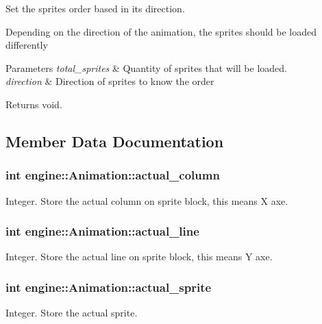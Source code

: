 Set the sprites order based in its direction. 

Depending on the direction of the animation, the sprites should be loaded differently


\begin{DoxyParams}{Parameters}
{\em total\+\_\+sprites} & Quantity of sprites that will be loaded. \\
\hline
{\em direction} & Direction of sprites to know the order \\
\hline
\end{DoxyParams}
\begin{DoxyReturn}{Returns}
void. 
\end{DoxyReturn}


\subsection{Member Data Documentation}
\subsubsection[{\texorpdfstring{actual\+\_\+column}{actual_column}}]{\setlength{\rightskip}{0pt plus 5cm}int engine\+::\+Animation\+::actual\+\_\+column}\hypertarget{classengine_1_1_animation_afe6d357389bc518781784af14d561445}{}\label{classengine_1_1_animation_afe6d357389bc518781784af14d561445}
Integer. Store the actual column on sprite block, this means X axe. 
\subsubsection[{\texorpdfstring{actual\+\_\+line}{actual_line}}]{\setlength{\rightskip}{0pt plus 5cm}int engine\+::\+Animation\+::actual\+\_\+line}\hypertarget{classengine_1_1_animation_ac0d6da823ddcc6e359df78bd3a88dbfc}{}\label{classengine_1_1_animation_ac0d6da823ddcc6e359df78bd3a88dbfc}
Integer. Store the actual line on sprite block, this means Y axe. 
\subsubsection[{\texorpdfstring{actual\+\_\+sprite}{actual_sprite}}]{\setlength{\rightskip}{0pt plus 5cm}int engine\+::\+Animation\+::actual\+\_\+sprite}\hypertarget{classengine_1_1_animation_a85d2b1875a28c207776435d698cf1ac7}{}\label{classengine_1_1_animation_a85d2b1875a28c207776435d698cf1ac7}
Integer. Store the actual sprite. 
